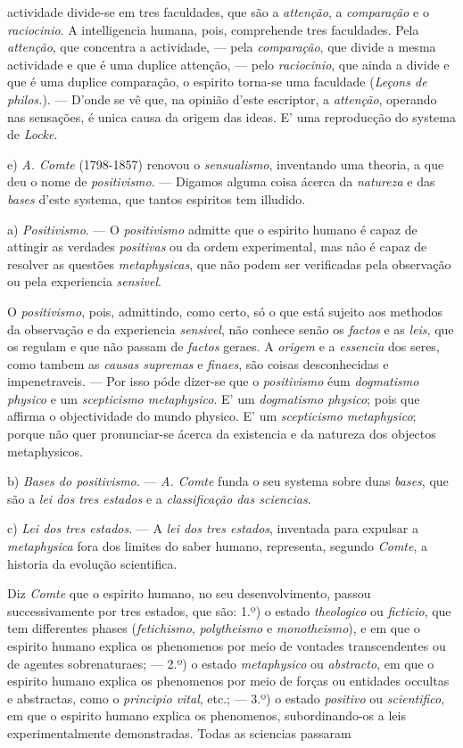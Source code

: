 actividade divide-se em tres faculdades, que são a \emph{attenção}, a \emph{comparação} e o \emph{raciocinio}. A intelligencia humana, pois, comprehende tres faculdades. Pela \emph{attenção}, que concentra a actividade, --- pela \emph{comparação}, que divide a mesma actividade e que é uma duplice attenção, --- pelo \emph{raciocinio}, que ainda a divide e que é uma duplice comparação, o espirito torna-se uma faculdade (\emph{Leçons de philos.}). --- D'onde se vê que, na opinião d'este escriptor, a \emph{attenção}, operando nas sensações, é unica causa da origem das ideas. E' uma reproducção do systema de \emph{Locke}.\par e) \emph{A. Comte} (1798-1857) renovou o \emph{sensualismo}, inventando uma theoria, a que deu o nome de \emph{positivismo}. --- Digamos alguma coisa ácerca da \emph{natureza} e das \emph{bases} d'este systema, que tantos espiritos tem illudido.\par a) \emph{Positivismo}. --- O \emph{positivismo} admitte que o espirito humano é capaz de attingir as verdades \emph{positivas} ou da ordem experimental, mas não é capaz de resolver as questões \emph{metaphysicas}, que não podem ser verificadas pela observação ou pela experiencia \emph{sensivel}.\par O \emph{positivismo}, pois, admittindo, como certo, só o que está sujeito aos methodos da observação e da experiencia \emph{sensivel}, não conhece senão os \emph{factos} e as \emph{leis}, que os regulam e que não passam de \emph{factos} geraes. A \emph{origem} e a \emph{essencia} dos seres, como tambem as \emph{causas supremas} e \emph{finaes}, são coisas desconhecidas e impenetraveis. --- Por isso póde dizer-se que o \emph{positivismo} éum \emph{dogmatismo physico} e um \emph{scepticismo metaphysico}. E' um \emph{dogmatismo physico}; pois que affirma o objectividade do mundo physico. E' um \emph{scepticismo metaphysico}; porque não quer pronunciar-se ácerca da existencia e da natureza dos objectos metaphysicos.\par b) \emph{Bases do positivismo}. --- \emph{A. Comte} funda o seu systema sobre duas \emph{bases}, que são a \emph{lei dos tres estados} e a \emph{classificação das sciencias}.\par c) \emph{Lei dos tres estados}. --- A \emph{lei dos tres estados}, inventada para expulsar a \emph{metaphysica} fora dos limites do saber humano, representa, segundo \emph{Comte}, a historia da evolução scientifica.\par Diz \emph{Comte} que o espirito humano, no seu desenvolvimento, passou successivamente por tres estados, que são: 1.º) o estado \emph{theologico} ou \emph{ficticio}, que tem differentes phases (\emph{fetichismo}, \emph{polytheismo} e \emph{monotheismo}), e em que o espirito humano explica os phenomenos por meio de vontades transcendentes ou de agentes sobrenaturaes; --- 2.º) o estado \emph{metaphysico} ou \emph{abstracto}, em que o espirito humano explica os phenomenos por meio de forças ou entidades occultas e abstractas, como o \emph{principio vital}, etc.; --- 3.º) o estado \emph{positivo} ou \emph{scientifico}, em que o espirito humano explica os phenomenos, subordinando-os a leis experimentalmente demonstradas. Todas as sciencias passaram 